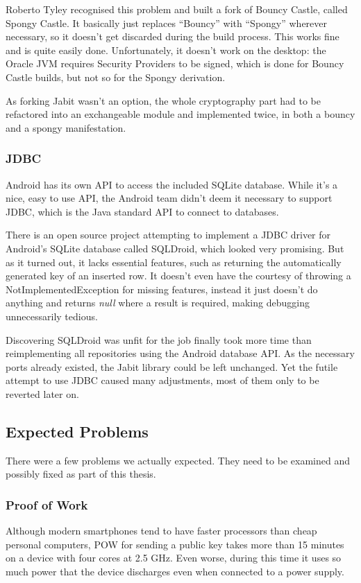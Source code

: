 \documentclass{bfh}
\begin{document}
  Roberto Tyley recognised this problem and built a fork of Bouncy Castle, called Spongy Castle.\cite{spongy} It basically just replaces “Bouncy” with “Spongy” wherever necessary, so it doesn’t get discarded during the build process. This works fine and is quite easily done. Unfortunately, it doesn’t work on the desktop: the Oracle JVM requires Security Providers to be signed, which is done for Bouncy Castle builds, but not so for the Spongy derivation.

  As forking Jabit wasn’t an option, the whole cryptography part had to be refactored into an exchangeable module and implemented twice, in both a bouncy and a spongy manifestation.

  \subsubsection{JDBC}
  \label{subsec:jdbc}
  Android has its own \ac{API} to access the included SQLite database. While it’s a nice, easy to use \ac{API}, the Android team didn’t deem it necessary to support \acs{JDBC}, which is the Java standard API to connect to databases.

  There is an open source project attempting to implement a \ac{JDBC} driver for Android’s SQLite database called SQLDroid, which looked very promising. But as it turned out, it lacks essential features, such as returning the automatically generated key of an inserted row. It doesn't even have the courtesy of throwing a NotImplementedException for missing features, instead it just doesn't do anything and returns \textit{null} where a result is required, making debugging unnecessarily tedious.\cite{github:sqldroid}

  Discovering SQLDroid was unfit for the job finally took more time than reimplementing all repositories using the Android database API. As the necessary ports already existed, the Jabit library could be left unchanged. Yet the futile attempt to use JDBC caused many adjustments, most of them only to be reverted later on.

  \subsection{Expected Problems}
  There were a few problems we actually expected. They need to be examined and possibly fixed as part of this thesis.

  \subsubsection{Proof of Work}
  Although modern smartphones tend to have faster processors than cheap personal computers, \acf{POW} for sending a public key takes more than 15 minutes on a device with four cores at 2.5 GHz. Even worse, during this time it uses so much power that the device discharges even when connected to a power supply.
\end{document}
